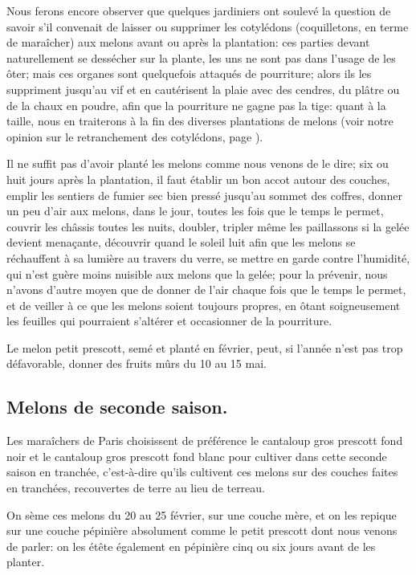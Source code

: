 \documentclass[10pt,a4paper]{book}
\begin{document}
Nous ferons encore observer que quelques jardiniers ont soulevé la question de savoir s'il convenait de laisser ou supprimer les cotylédons (coquilletons, en terme de maraîcher) aux melons avant ou après la plantation: ces parties devant naturellement se dessécher sur la plante, les uns ne sont pas dans l'usage de les ôter; mais ces organes sont quelquefois attaqués de pourriture; alors ils les suppriment jusqu'au vif et en cautérisent la plaie avec des cendres, du plâtre ou de la chaux en poudre, afin que la pourriture ne gagne pas la tige: quant à la taille, nous en traiterons à la fin des diverses plantations de melons (voir notre opinion sur le retranchement des cotylédons, page \pageref{retranchementcotyledons}).

Il ne suffit pas d'avoir planté les melons comme nous venons de le dire; six ou huit jours après la plantation, il faut établir un bon accot autour des couches, emplir les sentiers de fumier sec bien pressé jusqu'au sommet des coffres, donner un peu d'air aux melons, dans le jour, toutes les fois que le temps le permet, couvrir les châssis toutes les nuits, doubler, tripler même les paillassons si la gelée devient menaçante, découvrir quand le soleil luit afin que les melons se réchauffent à sa lumière au travers du verre, se mettre en garde contre l'humidité, qui n'est guère moins nuisible aux melons que la gelée; pour la prévenir, nous n'avons d'autre moyen que de donner de l'air chaque fois que le temps le permet, et de veiller à ce que les melons soient toujours propres, en ôtant soigneusement les feuilles qui pourraient s'altérer et occasionner de la pourriture.

Le melon petit prescott, semé et planté en février, peut, si l'année n'est pas trop défavorable, donner des fruits mûrs du 10 au 15 mai.

\subsection{Melons de seconde saison.}

Les maraîchers de Paris choisissent de préférence le cantaloup gros prescott fond noir et le cantaloup gros prescott fond blanc pour cultiver dans cette seconde saison en tranchée, c'est-à-dire qu'ils cultivent ces melons sur des couches faites en tranchées, recouvertes de terre au lieu de terreau.

On sème ces melons du 20 au 25 février, sur une couche mère, et on les repique sur une couche pépinière absolument comme le petit prescott dont nous venons de parler: on les étête également en pépinière cinq ou six jours avant de les planter.
\end{document}
